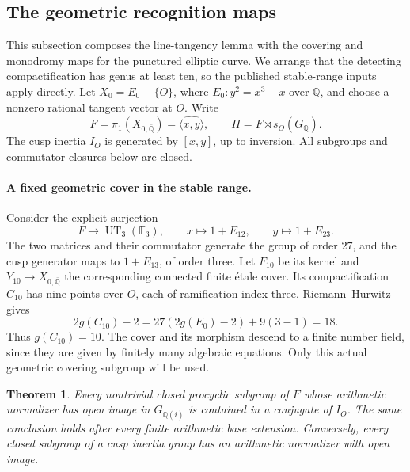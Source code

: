 \documentclass[11pt]{article}
\newtheorem{theorem}{Theorem}[section]
\theoremstyle{definition}\newtheorem{definition}[theorem]{Definition}
\begin{document}
\subsection{The geometric recognition maps}
\label{subsec:geometric-recognition-maps}

This subsection composes the line-tangency lemma with the
covering and monodromy maps for the punctured elliptic curve.  We arrange that the
detecting compactification has genus at least ten, so the published
stable-range inputs apply directly.
Let \(X_0=E_0-\{O\}\), where \(E_0:y^2=x^3-x\) over \(\mathbb Q\),
and choose a nonzero rational tangent vector at \(O\).
Write
\[
 F=\pi_1(X_{0,\overline{\mathbb Q}})
       =\widehat{\langle x,y\rangle},\qquad
 \Pi=F\rtimes s_O(G_{\mathbb Q}).
\]
The cusp inertia \(I_O\) is generated by \([x,y]\), up to inversion.
All subgroups and commutator closures below are closed.

\paragraph{A fixed geometric cover in the stable range.}
Consider the explicit surjection
\[
 F\longrightarrow \operatorname{UT}_3(\mathbb F_3),\qquad
 x\longmapsto1+E_{12},\qquad y\longmapsto1+E_{23}.
\]
The two matrices and their commutator generate the group of order
\(27\), and the cusp generator maps to \(1+E_{13}\), of order three.
Let \(F_{10}\) be its kernel and \(Y_{10}\to X_{0,\overline{\mathbb Q}}\)
the corresponding connected finite \'etale cover.
Its compactification \(C_{10}\) has nine points over \(O\),
each of ramification index three.  Riemann--Hurwitz gives
\[
 2g(C_{10})-2=27(2g(E_0)-2)+9(3-1)=18.
\]
Thus \(g(C_{10})=10\).
The cover and its morphism descend to a finite number field,
since they are given by finitely many algebraic equations.
Only this actual geometric covering subgroup will be used.

\begin{theorem}\label{thm:geometric-procyclic-recognition}
Every nontrivial closed procyclic subgroup of \(F\) whose
arithmetic normalizer has open image in \(G_{\mathbb Q(i)}\)
is contained in a conjugate of \(I_O\).
The same conclusion holds after every finite arithmetic base
extension.  Conversely, every closed subgroup of a cusp inertia
group has an arithmetic normalizer with open image.
\end{theorem}
\end{document}
